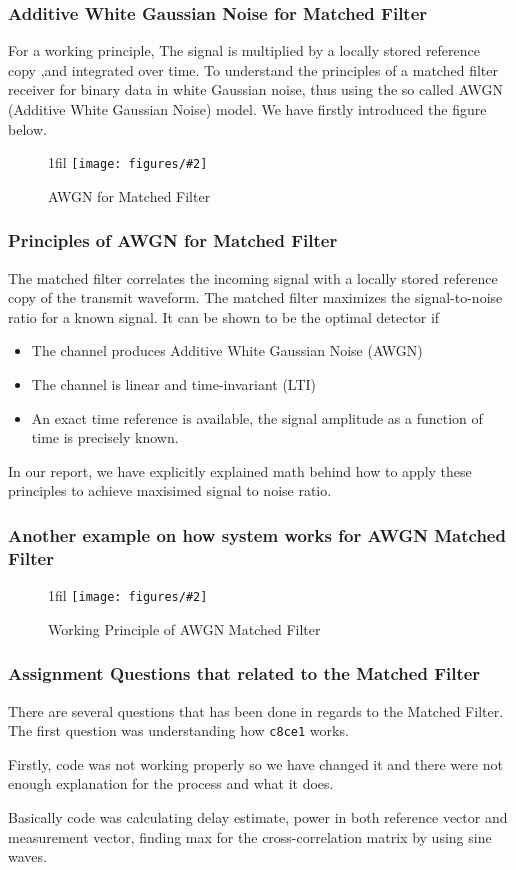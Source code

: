 \documentclass{beamer}
\makeatletter
\newcommand{\code}[1]{\texttt{#1}}
\newcommand*{\centerfloat}{%
  \parindent \z@
  \leftskip \z@ \@plus 1fil \@minus \textwidth
  \rightskip\leftskip
  \parfillskip \z@skip}
\newcommand{\fig}[3]{
  \begin{figure}[H]
  \centerfloat
    \texttt{[image: figures/\#2]}
    \caption{#3}
  \end{figure}
}
\makeatother
\begin{document}
\begin{frame}
	\frametitle{Additive White Gaussian Noise for Matched Filter}
For a working principle, The signal is multiplied by a locally stored reference copy ,and integrated over time.
To understand the principles of a matched filter receiver for binary data in white Gaussian noise, thus using the so called AWGN (Additive White Gaussian Noise) model. We have firstly introduced the figure below.
\fig{5cm}{figure_31.png}{AWGN for Matched Filter}
\end{frame}

\begin{frame}
	\frametitle{Principles of AWGN for Matched Filter}
The matched filter correlates the incoming signal with a locally stored reference copy of the transmit waveform. The matched filter maximizes the signal-to-noise ratio for a known signal. It can be shown to be the optimal detector if
\begin{itemize}
	\item The channel produces Additive White Gaussian Noise (AWGN)
	\item The channel is linear and time-invariant (LTI)
	\item An exact time reference is available, the signal amplitude as a function of time is precisely known.
\end{itemize}
In our report, we have explicitly explained math behind how to apply these principles to achieve maxisimed signal to noise ratio.
\end{frame}

\begin{frame}
	\frametitle{Another example on how system works for AWGN Matched Filter}
	\fig{5cm}{working_principle_mf.png} {Working Principle of AWGN Matched Filter}
\end{frame}
\begin{frame}
	\frametitle{Assignment Questions that related to the Matched Filter}
There are several questions that has been done in regards to the Matched Filter. The first question was understanding how \code{c8ce1} works.

Firstly, code was not working properly so we have changed it and there were not enough explanation for the process and what it does.

Basically code was calculating delay estimate, power in both reference vector and measurement vector, finding max for the cross-correlation matrix by using sine waves. 
\end{frame}
\end{document}
